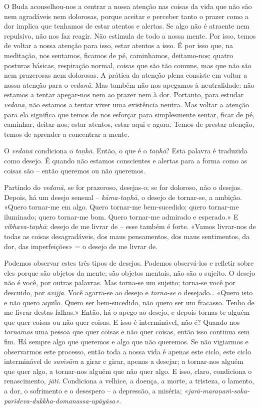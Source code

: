 O Buda aconselhou-nos a centrar a nossa atenção nas coisas da vida que não são
nem agradáveis nem dolorosas, porque aceitar e perceber tanto o prazer como a
dor implica que tenhamos de estar atentos e alertas. Se algo não é atraente nem
repulsivo, não nos faz reagir. Não estimula de todo a nossa mente. Por isso,
temos de voltar a nossa atenção para isso, estar atentos a isso. É por isso que,
na meditação, nos sentamos, ficamos de pé, caminhamos, deitamo-nos; quatro
posturas básicas, respiração normal, coisas que são tão comuns, mas que não são
nem prazerosas nem dolorosas. A prática da atenção plena consiste em voltar a
nossa atenção para o \emph{vedanā}. Mas também não nos apegamos à neutralidade:
não estamos a tentar apegar-nos nem ao prazer nem à dor. Portanto, para estudar
\emph{vedanā}, não estamos a tentar viver uma existência neutra. Mas voltar a
atenção para ela significa que temos de nos esforçar para simplesmente sentar,
ficar de pé, caminhar, deitar-nos; estar atentos, estar aqui e agora. Temos de
prestar atenção, temos de aprender a concentrar a mente.

O \emph{vedanā} condiciona o \emph{taṇhā}. Então, o que é o \emph{taṇhā}? Esta
palavra é traduzida como desejo. É quando não estamos conscientes e alertas para
a forma como as coisas são -- então queremos ou não queremos.

Partindo do \emph{vedanā}, se for prazeroso, desejas-o; se for doloroso, não o
desejas. Depois, há um desejo sensual -- \emph{kāma-taṇhā}, o desejo de
tornar-se, a ambição. «Quero tornar-me em algo. Quero tornar-me
bem-sucedido; quero tornar-me iluminado; quero tornar-me bom. Quero
tornar-me admirado e esperado.» E \emph{vibhava-taṇhā}: desejo de me livrar de
-- esse também é forte. «Vamos livrar-nos de todas as coisas desagradáveis, dos
maus pensamentos, dos maus sentimentos, da dor, das imperfeições» = o desejo de
me livrar de.

Podemos observar estes três tipos de desejos. Podemos observá-los e refletir
sobre eles porque são objetos da mente; são objetos mentais, não são o sujeito.
O desejo não é você, por outras palavras. Mas torna-se um sujeito; torna-se
você por descuido, por \emph{avijjā}. Você agarra-se ao desejo e
\emph{torna-se} o desejado\ldots{} «Quero isto e não quero aquilo. Quero ser
bem-sucedido, não quero ser um fracasso. Tenho de me livrar destas falhas.»
Então, há o apego ao desejo, e depois tornas-te alguém que quer coisas ou não
quer coisas. E isso é interminável, não é? Quando nos \emph{tornamos} uma pessoa
que quer coisas e não quer coisas, então isso continua sem fim. Há sempre algo
que queremos e algo que não queremos. Se não vigiarmos e observarmos este
processo, então toda a nossa vida é apenas este ciclo, este ciclo interminável
de \emph{saṁsāra} a girar e girar, apenas a desejar; a tornar-nos alguém que
quer algo, a tornar-nos alguém que não quer algo. E isso, claro, condiciona o
renascimento, \emph{jāti}. Condiciona a velhice, a doença, a morte, a tristeza,
o lamento, a dor, o sofrimento e o desespero -- a depressão, a miséria;
\emph{«jarā-maraṇaṁ-soka-parideva-dukkha-domanassa-upāyāsa»}.

